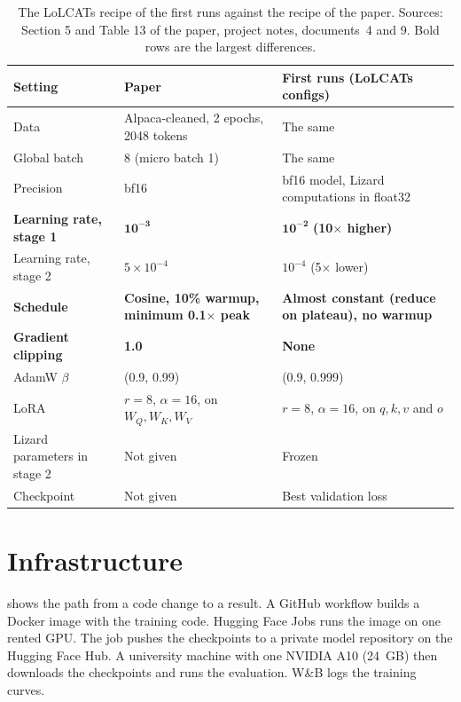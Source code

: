 \begin{table}[ht]
\centering
\small
\caption[The LoLCATs recipe against the recipe of the paper]{The LoLCATs recipe of the first runs against the recipe of the paper. Sources: Section 5 and Table 13 of the paper, project notes, documents~4 and 9. Bold rows are the largest differences.}
\label{tab:recipes}
\begin{tabularx}{\linewidth}{@{}lLL@{}}
\toprule
Setting & Paper & First runs (LoLCATs configs) \\
\midrule
Data & Alpaca-cleaned, 2 epochs, 2048 tokens & The same \\
Global batch & 8 (micro batch 1) & The same \\
Precision & bf16 & bf16 model, Lizard computations in float32 \\
\textbf{Learning rate, stage 1} & $\mathbf{10^{-3}}$ & $\mathbf{10^{-2}}$ \textbf{(10$\times$ higher)} \\
Learning rate, stage 2 & $5 \times 10^{-4}$ & $10^{-4}$ (5$\times$ lower) \\
\textbf{Schedule} & \textbf{Cosine, 10\% warmup, minimum 0.1$\times$ peak} & \textbf{Almost constant (reduce on plateau), no warmup} \\
\textbf{Gradient clipping} & \textbf{1.0} & \textbf{None} \\
AdamW $\beta$ & (0.9, 0.99) & (0.9, 0.999) \\
LoRA & $r = 8$, $\alpha = 16$, on $W_Q, W_K, W_V$ & $r = 8$, $\alpha = 16$, on $q, k, v$ and $o$ \\
Lizard parameters in stage 2 & Not given & Frozen \\
Checkpoint & Not given & Best validation loss \\
\bottomrule
\end{tabularx}
\end{table}

\section{Infrastructure}
\label{sec:infra}

 shows the path from a code change to a result. A GitHub workflow builds a Docker image with the training code. Hugging Face Jobs runs the image on one rented GPU. The job pushes the checkpoints to a private model repository on the Hugging Face Hub. A university machine with one NVIDIA A10 (24~GB) then downloads the checkpoints and runs the evaluation. W\&B logs the training curves.

